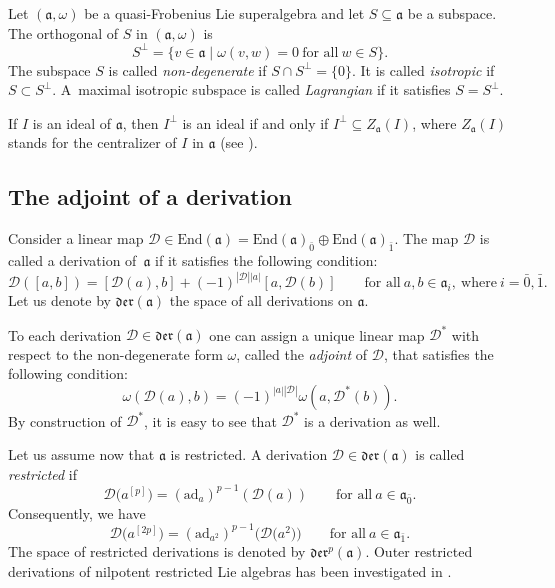 \documentclass[10pt,a4paper]{amsart}
\numberwithin{equation}{section}
\begin{document}
Let $(\mathfrak{a}, \omega)$ be a quasi-Frobenius Lie superalgebra and let $S \subseteq \mathfrak{a}$ be a subspace. The orthogonal of $S$ in $(\mathfrak{a}, \omega)$ is
\[
S^\perp = \{v \in \mathfrak{a}\mid \omega(v,w) = 0\ \text{for all} \ w \in S\}.
\]
The subspace $S$ is called {\it non-degenerate} if $S \cap S^\perp = \{0\}$. It is called
{\it isotropic} if ${S \subset S^\perp}$. A~maximal isotropic subspace is called {\it Lagrangian} if it satisfies $S = S^\perp$.

If $I$ is an ideal of $\mathfrak{a}$, then $I^\perp$ is an ideal if and only if $I^\perp \subseteq Z_\mathfrak{a}(I)$, where $Z_\mathfrak{a}(I)$ stands for
the centralizer of $I$ in $\mathfrak{a}$ (see \cite[Lemma~2.4]{BM}).

\subsection{The adjoint of a derivation}
Consider a linear map ${\mathscr D}\in \mathrm{End}(\mathfrak{a})=\mathrm{End}(\mathfrak{a})_{\bar 0}\oplus \mathrm{End}(\mathfrak{a})_{\bar 1} $. The map ${\mathscr D}$ is called a derivation of~$\mathfrak{a}$ if it satisfies the following condition:
\[
{\mathscr D}([a,b])=[ {\mathscr D}(a),b] +(-1)^{|{\mathscr D}||a|} [a, {\mathscr D} (b)]\qquad \text{for all}\ a, b\in \mathfrak{a}_i,\ \text{where}\ i=\bar 0, \bar 1.
\]
Let us denote by $\mathfrak{der}(\mathfrak{a})$ the space of all derivations on $\mathfrak{a}$.

To each derivation ${\mathscr D}\in \mathfrak{der}(\mathfrak{a})$ one can assign a unique linear map ${\mathscr D}^*$ with respect to the non-degenerate form $\omega$, called the {\it adjoint} of ${\mathscr D}$, that satisfies the following condition:
\[
\omega({\mathscr D}(a),b) = (-1)^{|a| |{\mathscr D}|} \omega(a, {\mathscr D}^*(b)).
\]
By construction of ${\mathscr D}^*$, it is easy to see that ${\mathscr D}^*$ is a derivation as well.

Let us assume now that $\mathfrak{a}$ is restricted. A derivation $\mathscr{D}\in \mathfrak{der}(\mathfrak{a})$ is called \textit{restricted} if
\[
\mathscr{D}\bigl(a^{[p]}\bigr)=(\mathrm{ad}_a)^{p-1} (\mathscr{D}(a)) \qquad \text{for all} \ a\in \mathfrak{a}_{\bar 0}.
\]
Consequently, we have
\[
\mathscr{D}\bigl(a^{[2p]}\bigr)=(\mathrm{ad}_{a^2})^{p-1} \bigl(\mathscr{D}\big(a^2\big)\bigr) \qquad \text{for all} \ a\in \mathfrak{a}_{\bar 1}.
\]
The space of restricted derivations is denoted by $\mathfrak{der}^p(\mathfrak{a})$. Outer restricted derivations of nilpotent restricted Lie algebras has been investigated in \cite{FSW}.
\end{document}
